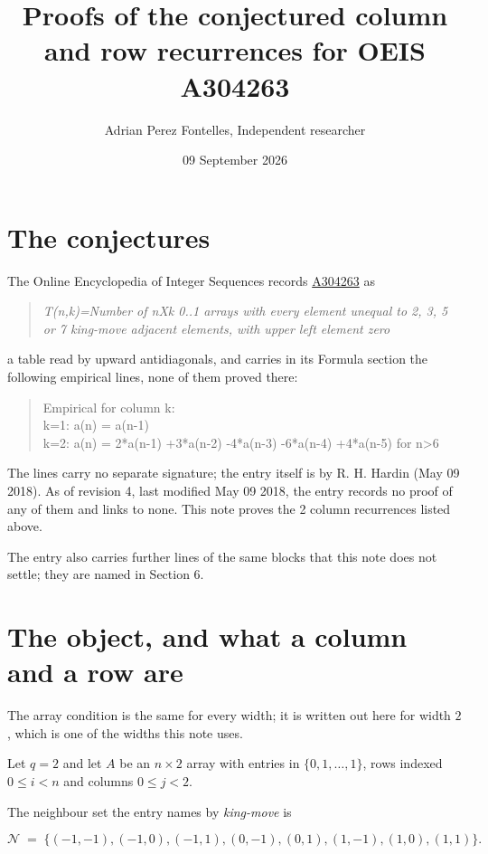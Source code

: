 \documentclass[11pt]{article}
\title{Proofs of the conjectured column and row recurrences for OEIS A304263}
\author{Adrian Perez Fontelles, Independent researcher}
\date{09 September 2026}
\theoremstyle{definition}
\begin{document}
\maketitle
\section{The conjectures}

The Online Encyclopedia of Integer Sequences records \href{https://oeis.org/A304263}{A304263} as

\begin{quote}\itshape T(n,k)=Number of nXk 0..1 arrays with every element unequal to 2, 3, 5 or 7 king-move adjacent elements, with upper left element zero\end{quote}

a table read by upward antidiagonals, and carries in its Formula section the following empirical lines, none of them proved there:

\begin{quote}\ttfamily Empirical for column k:\\
k=1: a(n) = a(n-1)\\k=2: a(n) = 2*a(n-1) +3*a(n-2) -4*a(n-3) -6*a(n-4) +4*a(n-5) for n>6\end{quote}

The lines carry no separate signature; the entry itself is by R. H. Hardin (May 09 2018). As of revision 4, last modified May 09 2018, the entry records no proof of any of them and links to none. This note proves the 2 column recurrences listed above.

The entry also carries further lines of the same blocks that this note does not settle; they are named in Section 6.

\section{The object, and what a column and a row are}

The array condition is the same for every width; it is written out here for width $2$, which is one of the widths this note uses.

Let $q = 2$ and let $A$ be an $n \times 2$ array with entries in $\{0,1,\dots,1\}$, rows indexed $0 \le i < n$ and columns $0 \le j < 2$.

The neighbour set the entry names by {\itshape king-move} is

\[\mathcal{N} \;=\; \{(-1,-1), (-1,0), (-1,1), (0,-1), (0,1), (1,-1), (1,0), (1,1)\}.\]
\end{document}
